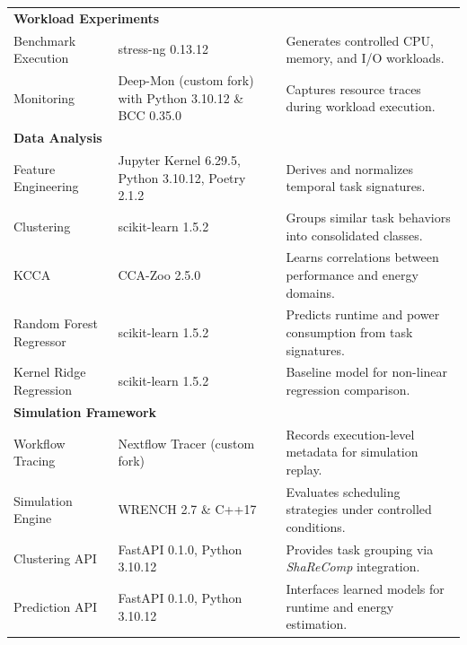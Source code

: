 \begin{table}[H]
{\begin{tabular}{
            p{4.5cm}
            >{\centering\arraybackslash}p{2.8cm}
            p{8.2cm}
            }
            \midrule
            \multicolumn{3}{l}{\textbf{Workload Experiments}}                                                                                                        \\[3pt]
            Benchmark Execution         & stress-ng 0.13.12                                        & Generates controlled CPU, memory, and I/O workloads.            \\
            Monitoring                  & Deep-Mon (custom fork) with Python 3.10.12 \& BCC 0.35.0 & Captures resource traces during workload execution.             \\

            \midrule
            \multicolumn{3}{l}{\textbf{Data Analysis}}                                                                                                               \\[3pt]
            Feature Engineering         & Jupyter Kernel 6.29.5, Python 3.10.12, Poetry 2.1.2      & Derives and normalizes temporal task signatures.                \\
            Clustering                  & scikit-learn 1.5.2                                       & Groups similar task behaviors into consolidated classes.        \\
            KCCA                        & CCA-Zoo 2.5.0                                            & Learns correlations between performance and energy domains.     \\
            Random Forest Regressor     & scikit-learn 1.5.2                                       & Predicts runtime and power consumption from task signatures.    \\
            Kernel Ridge Regression     & scikit-learn 1.5.2                                       & Baseline model for non-linear regression comparison.            \\

            \midrule
            \multicolumn{3}{l}{\textbf{Simulation Framework}}                                                                                                        \\[3pt]
            Workflow Tracing            & Nextflow Tracer (custom fork)                            & Records execution-level metadata for simulation replay.         \\
            Simulation Engine           & WRENCH 2.7 \& C++17                                      & Evaluates scheduling strategies under controlled conditions.    \\
            Clustering API              & FastAPI 0.1.0, Python 3.10.12                            & Provides task grouping via \textit{ShaReComp} integration.      \\
            Prediction API              & FastAPI 0.1.0, Python 3.10.12                            & Interfaces learned models for runtime and energy estimation.    \\


\end{tabular}}
\end{table}
